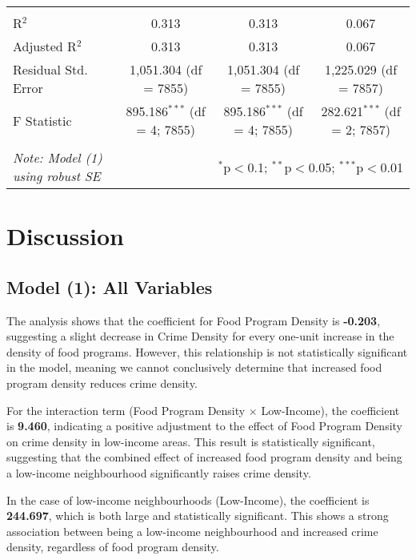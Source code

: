 \documentclass[AEJ]{AEA}
\begin{document}
\begin{table}[htbp!]
{\begin{tabular}{@{\extracolsep{5pt}}lccc}
  & & & \\ 
\hline \\[-1.8ex] 
R$^{2}$ & 0.313 & 0.313 & 0.067 \\ 
Adjusted R$^{2}$ & 0.313 & 0.313 & 0.067 \\ 
Residual Std. Error & 1,051.304 (df = 7855) & 1,051.304 (df = 7855) & 1,225.029 (df = 7857) \\ 
F Statistic & 895.186$^{***}$ (df = 4; 7855) & 895.186$^{***}$ (df = 4; 7855) & 282.621$^{***}$ (df = 2; 7857) \\ 
\hline 
\hline \\[-1.8ex] 
\textit{Note: Model (1) using robust SE}  & \multicolumn{3}{r}{$^{*}$p$<$0.1; $^{**}$p$<$0.05; $^{***}$p$<$0.01} \\ 
\end{tabular}
} %
\end{table}
\FloatBarrier %
\clearpage
\section{Discussion}

\subsection{Model (1): All Variables}

The analysis shows that the coefficient for Food Program Density is \textbf{-0.203}, suggesting a slight decrease in Crime Density for every one-unit increase in the density of food programs. However, this relationship is not statistically significant in the model, meaning we cannot conclusively determine that increased food program density reduces crime density.

For the interaction term (Food Program Density $\times$ Low-Income), the coefficient is \textbf{9.460}, indicating a positive adjustment to the effect of Food Program Density on crime density in low-income areas. This result is statistically significant, suggesting that the combined effect of increased food program density and being a low-income neighbourhood significantly raises crime density.

In the case of low-income neighbourhoods (Low-Income), the coefficient is \textbf{244.697}, which is both large and statistically significant. This shows a strong association between being a low-income neighbourhood and increased crime density, regardless of food program density.
\end{document}

